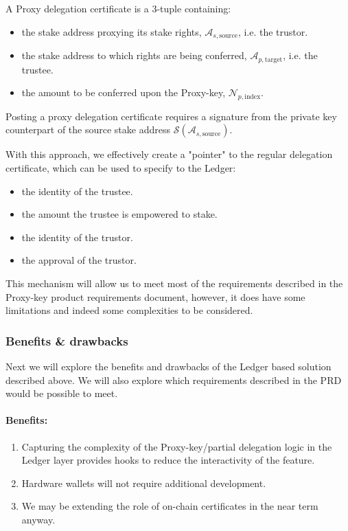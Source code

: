 \documentclass[11pt,a4paper]{article}
\begin{document}
\begin{description}
  \item A Proxy delegation certificate is a 3-tuple containing:
  \begin{itemize}
    \item the stake address proxying its stake rights, $\mathcal{A}_{s,\text{source}}$, i.e. the \gls{trustor}.
    \item the stake address to which rights are being conferred, $\mathcal{A}_{p,\text{target}}$, i.e. the \gls{trustee}.
    \item the amount to be conferred upon the Proxy-key, $\mathcal{N}_{p,\text{index}}$.
  \end{itemize}
  Posting a proxy delegation certificate requires a signature from the private key counterpart of the source 
  stake address $\mathcal{S}(\mathcal{A}_{s,\text{source}})$.
\end{description} 

With this approach, we effectively create a "pointer" to the regular delegation certificate, which can be used to specify to the Ledger:
\begin{itemize}
  \item the identity of the \gls{trustee}.
  \item the amount the \gls{trustee} is empowered to stake.
  \item the identity of the \gls{trustor}.
  \item the approval of the \gls{trustor}.
\end{itemize}

This mechanism will allow us to meet most of the requirements described in the Proxy-key product requirements document,
however, it does have some limitations and indeed some complexities to be considered.

\subsubsection{Benefits \& drawbacks}
Next we will explore the benefits and drawbacks of the Ledger based solution described above. We will also explore
which requirements described in the PRD would be possible to meet.

\paragraph{Benefits:}
\begin{enumerate} 
  \item Capturing the complexity of the Proxy-key/partial delegation logic in the Ledger layer provides hooks to reduce the interactivity of the feature.
  \item Hardware wallets will not require additional development.
  \item We may be extending the role of on-chain certificates in the near term anyway.
\end{enumerate}
\end{document}
